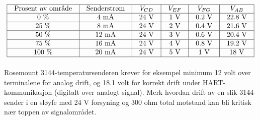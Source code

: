 






$$\vbox{\offinterlineskip
\halign{\strut
\vrule \quad\hfil # \ \hfil & 
\vrule \quad\hfil # \ \hfil & 
\vrule \quad\hfil # \ \hfil & 
\vrule \quad\hfil # \ \hfil & 
\vrule \quad\hfil # \ \hfil & 
\vrule \quad\hfil # \ \hfil \vrule \cr
\noalign{\hrule}
%
Prosent av område & Senderstrøm & $V_{CD}$ & $V_{EF}$ & $V_{FG}$ & $V_{AB}$ \cr
%
\noalign{\hrule}
%
0 \% & 4 mA & 24 V & 1 V & 0.2 V & 22.8 V \cr
%
\noalign{\hrule}
%
25 \% & 8 mA & 24 V & 2 V & 0.4 V & 21.6 V \cr
%
\noalign{\hrule}
%
50 \% & 12 mA & 24 V & 3 V & 0.6 V & 20.4 V \cr
%
\noalign{\hrule}
%
75 \% & 16 mA & 24 V & 4 V & 0.8 V & 19.2 V \cr
%
\noalign{\hrule}
%
100 \% & 20 mA & 24 V & 5 V & 1 V & 18 V \cr
%
\noalign{\hrule}
} %
}$$ %

Rosemount 3144-temperatursenderen krever for eksempel minimum 12 volt over terminalene for analog drift, og 18.1 volt for korrekt drift under HART-kommunikasjon (digitalt over analogt signal). Merk hvordan drift av en slik 3144-sender i en sløyfe med 24 V forsyning og 300 ohm total motstand kan bli kritisk nær toppen av signalområdet.









